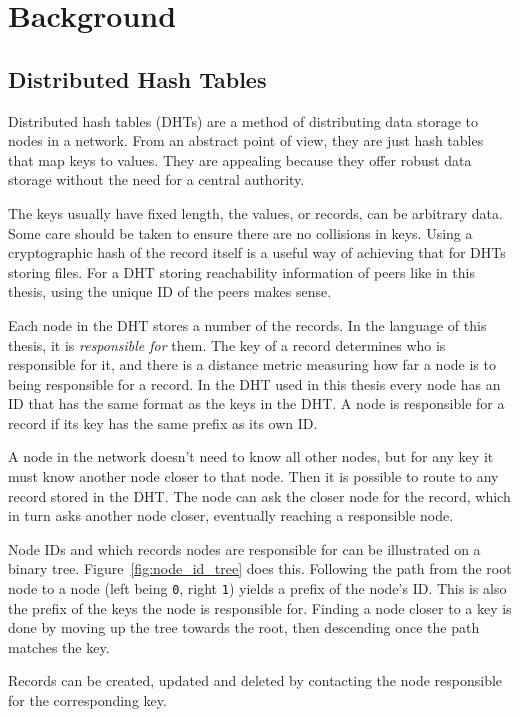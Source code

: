\chapter{Background}
\label{chap:background}
\section{Distributed Hash Tables}
\label{sec:background_dhts}
Distributed hash tables (DHTs) are a method of distributing data storage to
nodes in a network. From an abstract point of view, they are just hash tables
that map keys to values. They are appealing because they offer robust data
storage without the need for a central authority.

The keys usually have fixed length, the values, or records, can be arbitrary
data. Some care should be taken to ensure there are no collisions in keys. Using
a cryptographic hash of the record itself is a useful way of achieving that for
DHTs storing files. For a DHT storing reachability information of peers like in
this thesis, using the unique ID of the peers makes sense.

Each node in the DHT stores a number of the records. In the language of this
thesis, it is \emph{responsible for} them. The key of a record determines who is
responsible for it, and there is a distance metric measuring how far a node is
to being responsible for a record. In the DHT used in this thesis every node has
an ID that has the same format as the keys in the DHT. A node is responsible for
a record if its key has the same prefix as its own ID.

A node in the network doesn't need to know all other nodes, but for any key it
must know another node closer to that node. Then it is possible to route to any
record stored in the DHT. The node can ask the closer node for the record, which
in turn asks another node closer, eventually reaching a responsible node.

Node IDs and which records nodes are responsible for can be illustrated on a
binary tree. Figure~\ref{fig:node_id_tree} does this. Following the path from
the root node to a node (left being \texttt{0}, right \texttt{1}) yields a
prefix of the node's ID. This is also the prefix of the keys the node is
responsible for. Finding a node closer to a key is done by moving up the tree
towards the root, then descending once the path matches the key.

Records can be created, updated and deleted by contacting the node responsible
for the corresponding key.

